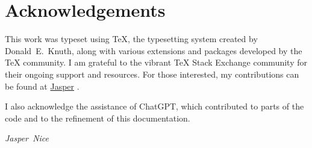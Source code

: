 \chapter*{Acknowledgements}
This work was typeset using \TeX{}, the typesetting system 
created by Donald~E.~Knuth, along with various extensions 
and packages developed by the \TeX{} community. I am grateful 
to the vibrant \TeX{} Stack Exchange community for their ongoing 
support and resources. For those interested, my contributions 
can be found at 
\href{https://tex.stackexchange.com/users/319072/jasper}{Jasper}
\cite{jasper_texse}.\par
I also acknowledge the assistance of ChatGPT,
which contributed to parts of the code and 
to the refinement of this documentation.\par
\vspace{2em}
\hfill\textit{Jasper~Nice}
